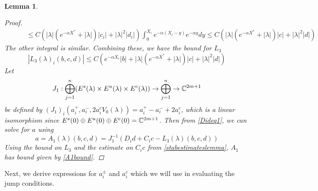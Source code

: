 \documentclass[10pt,reqno]{amsart}
\theoremstyle{plain}
\newtheorem{lemma}[theorem]{Lemma}
\theoremstyle{definition}
\theoremstyle{remark}
\numberwithin{theorem}{section}
\numberwithin{equation}{section}
\begin{document}
\begin{lemma}
\begin{proof}
\begin{align*}
&\qquad \leq C \left( |\lambda|(e^{-\alpha X^*}+ |\lambda|) |c_i| + |\lambda|^2 |d_i| \right) \int_0^{X_i} e^{-\alpha(X_i - y)} e^{-\alpha y} dy 
\leq C \left( |\lambda|(e^{-\alpha X^*}+ |\lambda|) |c| + |\lambda|^2 |d| \right)
\end{align*}
The other integral is similar. Combining these, we have the bound for $L_3$
\begin{equation}\label{L3bound}
|L_3(\lambda)_i(b, c, d)| \leq C \left( e^{-\alpha X_i} |b| + |\lambda|(e^{-\alpha X^*}+ |\lambda|) |c| + |\lambda|^2 |d| \right)
\end{equation}
Let 
\[
J_1: \bigoplus_{j=1}^n (E^s(\lambda) \times E^u(
\lambda) \times E^c(\lambda) ) \rightarrow \bigoplus_{j=1}^n \rightarrow \mathbb{C}^{2m+1}
\]
be defined by $(J_1)_i(a_i^+, a_i^-, 2 a_i^c V_0(\lambda)) = a_i^+ - a_i^- + 2 a_i^c$, which is a linear isomorphism since $E^s(0) \oplus E^u(0) \oplus E^c(0) = \mathbb{C}^{2m+1}$. Then from \cref{Dideq1}, we can solve for $a$ using  
\[
a = A_1(\lambda)(b, c, d) = J_1^{-1} \left(D_i d + C_i c - L_3(\lambda)(b, c, d)\right)
\]
Using the bound on $L_3$ and the estimate on $C_i c$ from \cref{stabestimateslemma}, $A_1$ has bound given by \cref{A1bound}.
\end{proof}
\end{lemma}

Next, we derive expressions for $a_i^\pm$ and $a_i^c$ which we will use in evaluating the jump conditions.
\end{document}
